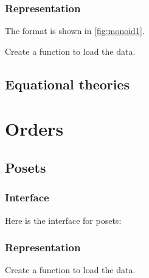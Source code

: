 
\subsection*{Representation}

The format is shown in \cref{fig:monoid1}.



\begin{gradedexercise}[Representation]
Create a function to load the data.


%

\end{gradedexercise}


\section{Equational theories}



\chapter{Orders}


\section{Posets}

\subsection*{Interface}

Here is the interface for posets:

%

\subsection*{Representation}


\begin{gradedexercise}[Representation]
Create a function to load the data.


%

\end{gradedexercise}

